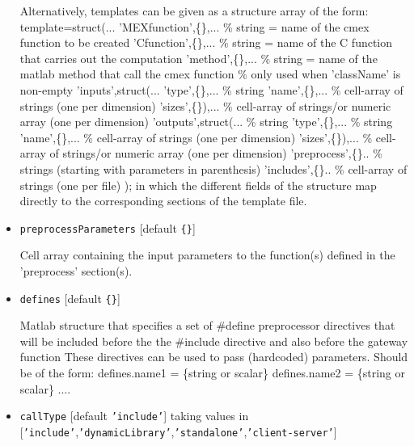 \begin{itemize}
Alternatively, templates can be given as a structure array of the form:   
 template=struct(...   
            'MEXfunction',\{\},... \% string = name of the cmex function to be created   
            'Cfunction',\{\},...   \% string = name of the C function that carries out the computation   
            'method',\{\},...      \% string = name of the matlab method that call the cmex function   
                                   \%          only used when 'className' is non-empty   
            'inputs',struct(...      
                'type',\{\},...    \% string   
                'name',\{\},...    \% cell-array of strings (one per dimension)   
                'sizes',\{\}),...  \% cell-array of strings/or numeric array (one per dimension)   
            'outputs',struct(...  \% string   
                'type',\{\},...    \% string   
                'name',\{\},...    \% cell-array of strings (one per dimension)   
                'sizes',\{\}),...  \% cell-array of strings/or numeric array (one per dimension)   
            'preprocess',\{\}..    \% strings (starting with parameters in parenthesis)   
            'includes',\{\}..      \% cell-array of strings (one per file)   
            );   
in which the different fields of the structure map directly   
to the corresponding sections of the template file.

\item \texttt{preprocessParameters} [default \texttt{\{\}}]

   Cell array containing the input parameters to the function(s) defined   
in the 'preprocess' section(s).

\item \texttt{defines} [default \texttt{\{\}}]

   Matlab structure that specifies a set of \#define   
preprocessor directives that will be included before the   
the \#include directive and also before the gateway function   
These directives can be used to pass (hardcoded) parameters.   
Should be of the form:   
      defines.name1 = \{string or scalar\}   
      defines.name2 = \{string or scalar\}   
     .... 

\item \texttt{callType} [default \texttt{'include'}] taking values in [\texttt{'include'},\texttt{'dynamicLibrary'},\texttt{'standalone'},\texttt{'client-server'}]


\end{itemize}
